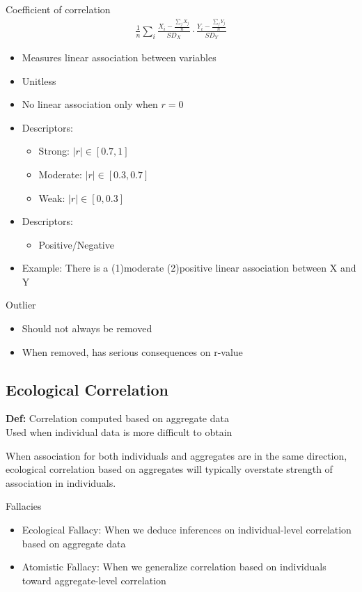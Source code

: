 \documentclass{article}
\begin{document}
Coefficient of correlation
\begin{align*}
	\frac{1}{n}\sum_i \frac{X_i-\frac{\sum_j X_j}{n}}{SD_X}\cdot \frac{Y_i-\frac{\sum_j Y_j}{n}}{SD_Y}
\end{align*}

\begin{itemize}
	\item Measures linear association between variables
	\item Unitless
	\item No linear association only when $r=0$
	\item Descriptors:
	\begin{itemize}
		\item Strong: $|r|\in [0.7, 1]$
		\item Moderate: $|r|\in [0.3, 0.7]$
		\item Weak: $|r|\in [0, 0.3]$
	\end{itemize}
	\item Descriptors:
	\begin{itemize}
		\item Positive/Negative
	\end{itemize}
	\item Example: There is a (1)moderate (2)positive linear association between X and Y
\end{itemize}

Outlier
\begin{itemize}
	\item Should not always be removed
	\item When removed, has serious consequences on r-value
\end{itemize}

\subsection{Ecological Correlation}
\textbf{Def:} Correlation computed based on aggregate data\\
Used when individual data is more difficult to obtain

When association for both individuals and aggregates are in the same direction, ecological correlation based on aggregates will typically overstate strength of association in individuals.

Fallacies
\begin{itemize}
	\item Ecological Fallacy: When we deduce inferences on individual-level correlation based on aggregate data
	\item Atomistic Fallacy: When we generalize correlation based on individuals toward aggregate-level correlation
\end{itemize}
\end{document}
